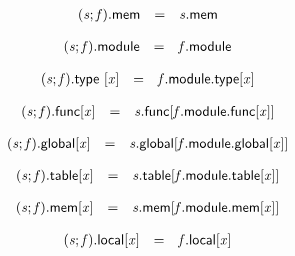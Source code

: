 $$
\begin{array}{@{}lcl@{}l@{}}
({\mathit{s}} ; {\mathit{f}}).\mathsf{mem} &=& {\mathit{s}}.\mathsf{mem} &  \\
\end{array}
$$

$$
\begin{array}{@{}lcl@{}l@{}}
({\mathit{s}} ; {\mathit{f}}).\mathsf{module} &=& {\mathit{f}}.\mathsf{module} &  \\
\end{array}
$$

$$
\begin{array}{@{}lcl@{}l@{}}
({\mathit{s}} ; {\mathit{f}}).\mathsf{type}~[{\mathit{x}}] &=& {\mathit{f}}.\mathsf{module}.\mathsf{type}[{\mathit{x}}] &  \\
\end{array}
$$

$$
\begin{array}{@{}lcl@{}l@{}}
{({\mathit{s}} ; {\mathit{f}}).\mathsf{func}}{[{\mathit{x}}]} &=& {\mathit{s}}.\mathsf{func}[{\mathit{f}}.\mathsf{module}.\mathsf{func}[{\mathit{x}}]] &  \\
\end{array}
$$

$$
\begin{array}{@{}lcl@{}l@{}}
{({\mathit{s}} ; {\mathit{f}}).\mathsf{global}}{[{\mathit{x}}]} &=& {\mathit{s}}.\mathsf{global}[{\mathit{f}}.\mathsf{module}.\mathsf{global}[{\mathit{x}}]] &  \\
\end{array}
$$

$$
\begin{array}{@{}lcl@{}l@{}}
{({\mathit{s}} ; {\mathit{f}}).\mathsf{table}}{[{\mathit{x}}]} &=& {\mathit{s}}.\mathsf{table}[{\mathit{f}}.\mathsf{module}.\mathsf{table}[{\mathit{x}}]] &  \\
\end{array}
$$

$$
\begin{array}{@{}lcl@{}l@{}}
{({\mathit{s}} ; {\mathit{f}}).\mathsf{mem}}{[{\mathit{x}}]} &=& {\mathit{s}}.\mathsf{mem}[{\mathit{f}}.\mathsf{module}.\mathsf{mem}[{\mathit{x}}]] &  \\
\end{array}
$$

$$
\begin{array}{@{}lcl@{}l@{}}
{({\mathit{s}} ; {\mathit{f}}).\mathsf{local}}{[{\mathit{x}}]} &=& {\mathit{f}}.\mathsf{local}[{\mathit{x}}] &  \\
\end{array}
$$


